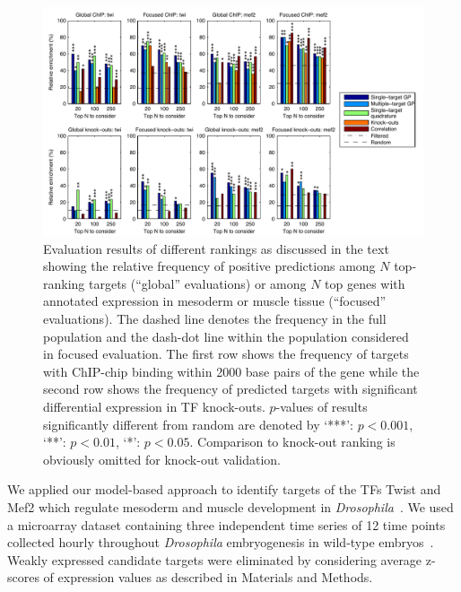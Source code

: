 \documentclass{pnastwo}
\begin{document}
\begin{article}
\begin{figure}[tb]
  \centering
  \includegraphics{fig3}
  \caption{Evaluation results of different rankings as
    discussed in the text showing the relative frequency of positive
    predictions among $N$ top-ranking targets (``global'' evaluations)
    or among $N$ top genes
    with annotated expression in mesoderm or muscle tissue
    (``focused'' evaluations).
    The dashed line
    denotes the frequency in the full population and the dash-dot
    line within the population considered in focused evaluation.
    The first row shows the frequency of targets with ChIP-chip
    binding within 2000 base pairs of the gene
    while the second row shows the frequency of
    predicted targets with significant differential
    expression in TF knock-outs.
    $p$-values of results significantly different from random are
    denoted by `***': $p <
    0.001$, `**': $p < 0.01$, `*': $p < 0.05$.
    Comparison to knock-out ranking is obviously omitted for knock-out
    validation. \label{fig:dros_global_evaluation}
  }
\end{figure}

We applied our model-based approach to identify targets of the TFs
Twist and Mef2 which regulate mesoderm and muscle development in
\emph{Drosophila}~\cite{Sandmann2007,Zinzen2009}. We used a microarray dataset
containing three independent time series of 12 time points collected
hourly throughout \emph{Drosophila} embryogenesis in wild-type
embryos~\cite{Tomancak2002}.  Weakly expressed candidate targets were eliminated by 
considering average z-scores of expression values as described in
Materials and Methods.


\end{article}
\end{document}
